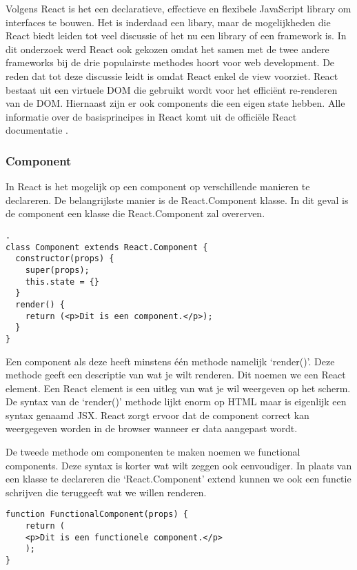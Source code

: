 Volgens React is het een declaratieve, effectieve en flexibele JavaScript library om interfaces te bouwen. Het is inderdaad een libary, maar de mogelijkheden die React biedt leiden tot veel discussie of het nu een library of een framework is. In dit onderzoek werd React ook gekozen omdat het samen met de twee andere frameworks bij de drie populairste methodes hoort voor web development. De reden dat tot deze discussie leidt is omdat React enkel de view voorziet. React bestaat uit een virtuele DOM die gebruikt wordt voor het efficiënt re-renderen van de DOM. Hiernaast zijn er ook components die een eigen state hebben.
Alle informatie over de basisprincipes in React komt uit de officiële React documentatie \autocite{_react_2018}.

\subsubsection{Component}
\label{sec:React_Component}
In React is het mogelijk op een component op verschillende manieren te declareren. De belangrijkste manier is de React.Component klasse. In dit geval is de component een klasse die React.Component zal overerven.

\begin{verbatim}.
class Component extends React.Component {
  constructor(props) {
    super(props);
    this.state = {}
  }  
  render() {
    return (<p>Dit is een component.</p>);
  }
}
\end{verbatim}

Een component als deze heeft minstens één methode namelijk ‘render()’. Deze methode geeft een descriptie van wat je wilt renderen. Dit noemen we een React element. Een React element is een uitleg van wat je wil weergeven op het scherm. De syntax van de ‘render()’ methode lijkt enorm op HTML maar is eigenlijk een syntax genaamd JSX. React zorgt ervoor dat de component correct kan weergegeven worden in de browser wanneer er data aangepast wordt.

De tweede methode om componenten te maken noemen we functional components. Deze syntax is korter wat wilt zeggen ook eenvoudiger. In plaats van een klasse te declareren die ‘React.Component’ extend kunnen we ook een functie schrijven die teruggeeft wat we willen renderen.

\begin{verbatim}
function FunctionalComponent(props) {
	return (
	<p>Dit is een functionele component.</p>
	);
}
\end{verbatim}

